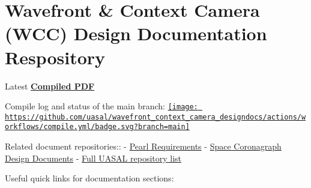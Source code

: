 \hypertarget{wavefront-context-camera-wcc-design-documentation-respository}{%
\section{Wavefront \& Context Camera (WCC) Design Documentation
Respository}\label{wavefront-context-camera-wcc-design-documentation-respository}}

Latest
\textbf{\href{https://github.com/uasal/wavefront_context_camera_designdocs/raw/compiled/instrument_guide.pdf}{Compiled
PDF}}

Compile log and status of the main branch:
\href{https://github.com/uasal/wavefront_context_camera_designdocs/actions}{\texttt{[image: https://github.com/uasal/wavefront\_context\_camera\_designdocs/actions/workflows/compile.yml/badge.svg?branch=main]}}

Related document repositories:: -
\href{https://github.com/uasal/pearl_requirements}{Pearl Requirements} -
\href{https://github.com/uasal/spacecoron_design_docs}{Space Coronagraph
Design Documents} -
\href{https://github.com/orgs/uasal/repositories}{Full UASAL repository
list}

Useful quick links for documentation sections:
